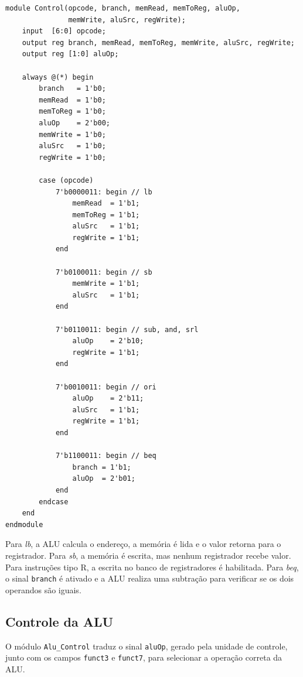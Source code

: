 \documentclass[12pt,a4paper]{article}
\begin{document}
\begin{lstlisting}[style=verilogstyle,caption={Trecho principal da unidade de controle.}]
module Control(opcode, branch, memRead, memToReg, aluOp,
               memWrite, aluSrc, regWrite);
    input  [6:0] opcode;
    output reg branch, memRead, memToReg, memWrite, aluSrc, regWrite;
    output reg [1:0] aluOp;

    always @(*) begin
        branch   = 1'b0;
        memRead  = 1'b0;
        memToReg = 1'b0;
        aluOp    = 2'b00;
        memWrite = 1'b0;
        aluSrc   = 1'b0;
        regWrite = 1'b0;

        case (opcode)
            7'b0000011: begin // lb
                memRead  = 1'b1;
                memToReg = 1'b1;
                aluSrc   = 1'b1;
                regWrite = 1'b1;
            end

            7'b0100011: begin // sb
                memWrite = 1'b1;
                aluSrc   = 1'b1;
            end

            7'b0110011: begin // sub, and, srl
                aluOp    = 2'b10;
                regWrite = 1'b1;
            end

            7'b0010011: begin // ori
                aluOp    = 2'b11;
                aluSrc   = 1'b1;
                regWrite = 1'b1;
            end

            7'b1100011: begin // beq
                branch = 1'b1;
                aluOp  = 2'b01;
            end
        endcase
    end
endmodule
\end{lstlisting}

Para \textit{lb}, a ALU calcula o endereço, a memória é lida e o valor retorna para o registrador. Para \textit{sb}, a memória é escrita, mas nenhum registrador recebe valor. Para instruções tipo R, a escrita no banco de registradores é habilitada. Para \textit{beq}, o sinal \texttt{branch} é ativado e a ALU realiza uma subtração para verificar se os dois operandos são iguais.

\subsection{Controle da ALU}

O módulo \texttt{Alu\_Control} traduz o sinal \texttt{aluOp}, gerado pela unidade de controle, junto com os campos \texttt{funct3} e \texttt{funct7}, para selecionar a operação correta da ALU.
\end{document}
